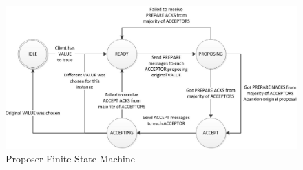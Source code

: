 \documentclass{article}
\begin{document}
\begin{figure}
\centering
\includegraphics[width=6in]{proposer_fsm.jpg}
\caption{Proposer Finite State Machine}
\label{proposer_fsm}
\end{figure}
\end{document}
